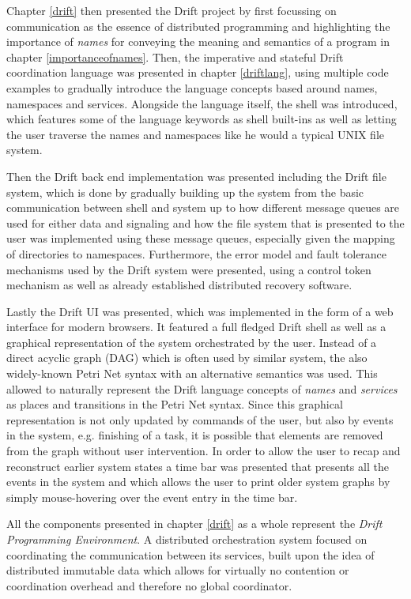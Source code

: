 Chapter \ref{drift} then presented the Drift project
by first focussing on communication as the essence of distributed
programming and highlighting the importance of \textit{names}
for conveying the meaning and semantics of a program in chapter
\ref{importanceofnames}. Then, the imperative and stateful Drift
coordination language was presented
in chapter \ref{driftlang}, using multiple code examples to
gradually introduce the language concepts based around names,
namespaces and services. Alongside the language itself, the shell
was introduced, which features some of the language keywords as
shell built-ins as well as letting the user traverse the names
and namespaces like he would a typical UNIX file system.

Then the Drift back end implementation was presented including
the Drift file system, which is done by gradually building up the
system from the basic communication between shell and system up to
how different message queues are used for either data and signaling
and how the file system that is presented to the user was implemented
using these message queues, especially given the mapping of directories
to namespaces. Furthermore, the error model and fault tolerance
mechanisms used by the Drift system were presented, using a control
token mechanism as well as already established distributed recovery software.
\newline

Lastly the Drift UI was presented, which was implemented in the
form of a web interface for modern browsers. It featured a full
fledged Drift shell as well as a graphical representation of
the system orchestrated by the user. Instead of a direct acyclic
graph (DAG) which is often used by similar system, the also
widely-known Petri Net syntax with an alternative semantics
was used. This allowed to naturally represent the Drift language
concepts of \textit{names} and \textit{services} as places
and transitions in the Petri Net syntax. Since this
graphical representation is not only updated by commands of
the user, but also by events in the system, e.g. finishing
of a task, it is possible that elements are removed from the
graph without user intervention. In order to allow the user
to recap and reconstruct earlier system states a time bar was
presented that presents all the events in the system and which
allows the user to print older system graphs by simply mouse-hovering
over the event entry in the time bar.
\newline

All the components presented in chapter \ref{drift} as a whole
represent the \textit{Drift Programming Environment}. A distributed
orchestration system focused on coordinating the communication between
its services, built upon the idea of distributed immutable data
which allows for virtually no contention or coordination overhead
and therefore no global coordinator.

